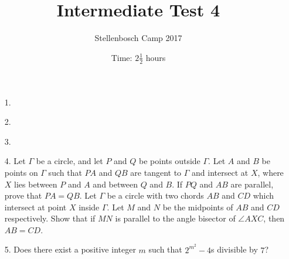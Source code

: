 \documentclass[12pt]{article}
\title{Intermediate Test 4}
\author{Stellenbosch Camp 2017}
\date{Time: $2\frac{1}{2}$ hours}
\begin{document}
 \maketitle

\begin{enumerate}

\item[1.] %


\item[2.] %


\item[3.] %


\item[4.] %
Let $\Gamma$ be a circle, and let $P$ and $Q$ be points outside $\Gamma$. Let $A$ and $B$ be points on $\Gamma$ such that $PA$ and $QB$ are tangent to $\Gamma$ and intersect at $X$, where $X$ lies between $P$ and $A$ and between $Q$ and $B$. If $PQ$ and $AB$ are parallel, prove that $PA = QB$.
Let $\Gamma$ be a circle with two chords $AB$ and $CD$ which intersect at point $X$ inside $\Gamma$. Let $M$ and $N$ be the midpoints of $AB$ and $CD$ respectively. Show that if $MN$ is parallel to the angle bisector of $\angle AXC$, then $AB = CD$.
 

\item[5.] %
Does there exist a positive integer $m$ such that $2^{m^2} - 4$s divisible by $7$?


\end{enumerate}
\end{document}
